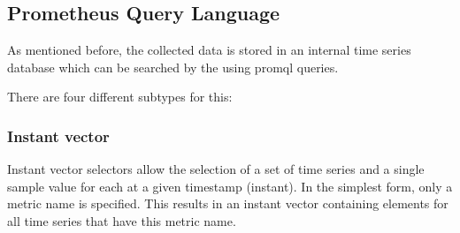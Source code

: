 \subsection{Prometheus Query Language}
\label{subsec:promql}
As mentioned before, the collected data is stored in an internal time series database which can be searched by the using \gls{promql} queries.

There are four different subtypes for this:
\subsubsection{Instant vector}
Instant vector selectors allow the selection of a set of time series and a single sample value for each at a given timestamp (instant). In the simplest form, only a metric name is specified. This results in an instant vector containing elements for all time series that have this metric name. 

